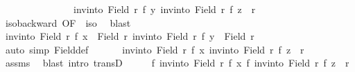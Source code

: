 \begin{isabellebody}
\ \ \ \ \ \ \ \ \ \ \ \ \ \ \ {\isachardoublequoteopen}{\isacharparenleft}{\kern0pt}inv{\isacharunderscore}{\kern0pt}into\ {\isacharparenleft}{\kern0pt}Field\ r{\isacharparenright}{\kern0pt}\ f\ y{\isacharcomma}{\kern0pt}\ inv{\isacharunderscore}{\kern0pt}into\ {\isacharparenleft}{\kern0pt}Field\ r{\isacharparenright}{\kern0pt}\ f\ z{\isacharparenright}{\kern0pt}\ {\isasymin}\ r{\isachardoublequoteclose}\ \isanewline
\ \ \ \ \isamarkupfalse%
\ iso{\isacharunderscore}{\kern0pt}backward\ {\isacharbrackleft}{\kern0pt}OF\ {\isacharunderscore}{\kern0pt}\ iso{\isacharbrackright}{\kern0pt}\ \isamarkupfalse%
\ blast{\isacharplus}{\kern0pt}\isanewline
\ \ \isamarkupfalse%
\ \isamarkupfalse%
\ {\isachardoublequoteopen}inv{\isacharunderscore}{\kern0pt}into\ {\isacharparenleft}{\kern0pt}Field\ r{\isacharparenright}{\kern0pt}\ f\ x\ {\isasymin}\ Field\ r{\isachardoublequoteclose}\ {\isachardoublequoteopen}inv{\isacharunderscore}{\kern0pt}into\ {\isacharparenleft}{\kern0pt}Field\ r{\isacharparenright}{\kern0pt}\ f\ y\ {\isasymin}\ Field\ r{\isachardoublequoteclose}\isanewline
\ \ \ \ \isamarkupfalse%
\ {\isacharparenleft}{\kern0pt}auto\ simp{\isacharcolon}{\kern0pt}\ Field{\isacharunderscore}{\kern0pt}def{\isacharparenright}{\kern0pt}\isanewline
\ \ \isamarkupfalse%
\ {\isacharasterisk}{\kern0pt}\ \isamarkupfalse%
\ {\isachardoublequoteopen}{\isacharparenleft}{\kern0pt}inv{\isacharunderscore}{\kern0pt}into\ {\isacharparenleft}{\kern0pt}Field\ r{\isacharparenright}{\kern0pt}\ f\ x{\isacharcomma}{\kern0pt}\ inv{\isacharunderscore}{\kern0pt}into\ {\isacharparenleft}{\kern0pt}Field\ r{\isacharparenright}{\kern0pt}\ f\ z{\isacharparenright}{\kern0pt}\ {\isasymin}\ r{\isachardoublequoteclose}\isanewline
\ \ \ \ \isamarkupfalse%
\ assms{\isacharparenleft}{\kern0pt}{}{\isacharparenright}{\kern0pt}\ \isamarkupfalse%
\ {\isacharparenleft}{\kern0pt}blast\ intro{\isacharcolon}{\kern0pt}\ transD{\isacharparenright}{\kern0pt}\isanewline
\ \ \isamarkupfalse%
\ \isamarkupfalse%
\ {\isachardoublequoteopen}{\isacharparenleft}{\kern0pt}f\ {\isacharparenleft}{\kern0pt}inv{\isacharunderscore}{\kern0pt}into\ {\isacharparenleft}{\kern0pt}Field\ r{\isacharparenright}{\kern0pt}\ f\ x{\isacharparenright}{\kern0pt}{\isacharcomma}{\kern0pt}\ f\ {\isacharparenleft}{\kern0pt}inv{\isacharunderscore}{\kern0pt}into\ {\isacharparenleft}{\kern0pt}Field\ r{\isacharparenright}{\kern0pt}\ f\ z{\isacharparenright}{\kern0pt}{\isacharparenright}{\kern0pt}\ {\isasymin}\ r{\isacharprime}{\kern0pt}{\isachardoublequoteclose}\isanewline

\end{isabellebody}

